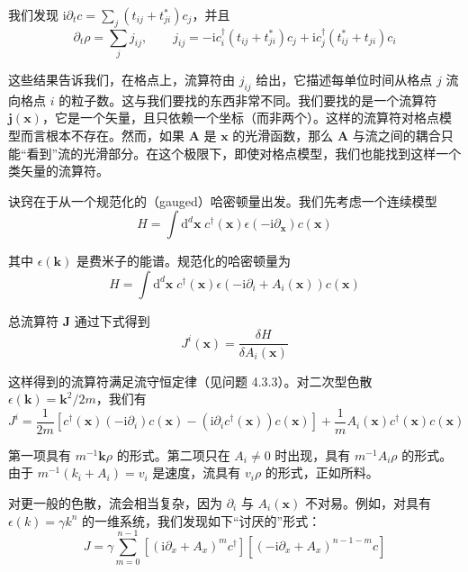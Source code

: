 我们发现 $\mathrm{i}\partial_t c=\sum_j(t_{ij}+t^{*}_{ji})c_j$，并且
\begin{equation*}
\partial_t\rho = \sum_j j_{ij}, \qquad j_{ij} = -\mathrm{i}c^{\dagger}_i(t_{ij}+t^{*}_{ji})c_j + \mathrm{i}c^{\dagger}_j(t^{*}_{ij}+t_{ji})c_i
\end{equation*}

这些结果告诉我们，在格点上，流算符由 $j_{ij}$ 给出，它描述每单位时间从格点 $j$ 流向格点 $i$ 的粒子数。这与我们要找的东西非常不同。我们要找的是一个流算符 $\pmb{j}(\pmb{x})$，它是一个矢量，且只依赖一个坐标（而非两个）。这样的流算符对格点模型而言根本不存在。然而，如果 $\pmb{A}$ 是 $\pmb{x}$ 的光滑函数，那么 $\pmb{A}$ 与流之间的耦合只能“看到”流的光滑部分。在这个极限下，即使对格点模型，我们也能找到这样一个类矢量的流算符。

诀窍在于从一个规范化的（gauged）哈密顿量出发。我们先考虑一个连续模型
\begin{equation*}
H = \int \mathrm{d}^d\pmb{x}\; c^{\dagger}(\pmb{x})\epsilon(-\mathrm{i}\partial_{\pmb{x}})c(\pmb{x})
\end{equation*}

其中 $\epsilon(\pmb{k})$ 是费米子的能谱。规范化的哈密顿量为
\begin{equation*}
H = \int \mathrm{d}^d\pmb{x}\; c^{\dagger}(\pmb{x})\epsilon(-\mathrm{i}\partial_i + A_i(\pmb{x}))c(\pmb{x}) \tag{4.3.4}
\end{equation*}

总流算符 $\pmb{J}$ 通过下式得到
\begin{equation*}
J^i(\pmb{x}) = \frac{\delta H}{\delta A_i(\pmb{x})} \tag{4.3.5}
\end{equation*}

这样得到的流算符满足流守恒定律（见问题 4.3.3）。对二次型色散 $\epsilon(\pmb{k})=\pmb{k}^2/2m$，我们有
\begin{equation*}
J^i = \frac{1}{2m}\left[c^{\dagger}(\pmb{x})(-\mathrm{i}\partial_i)c(\pmb{x}) - \left(\mathrm{i}\partial_i c^{\dagger}(\pmb{x})\right)c(\pmb{x})\right] + \frac{1}{m}A_i(\pmb{x})c^{\dagger}(\pmb{x})c(\pmb{x}) \tag{4.3.6}
\end{equation*}

第一项具有 $m^{-1}\pmb{k}\rho$ 的形式。第二项只在 $A_i\neq 0$ 时出现，具有 $m^{-1}A_i\rho$ 的形式。由于 $m^{-1}(k_i+A_i)=v_i$ 是速度，流具有 $v_i\rho$ 的形式，正如所料。

对更一般的色散，流会相当复杂，因为 $\partial_i$ 与 $A_i(\pmb{x})$ 不对易。例如，对具有 $\epsilon(k)=\gamma k^n$ 的一维系统，我们发现如下“讨厌的”形式：
\begin{equation*}
J = \gamma\sum_{m=0}^{n-1}\left[\left(\mathrm{i}\partial_x+A_x\right)^m c^{\dagger}\right]\left[\left(-\mathrm{i}\partial_x+A_x\right)^{n-1-m}c\right]
\end{equation*}

